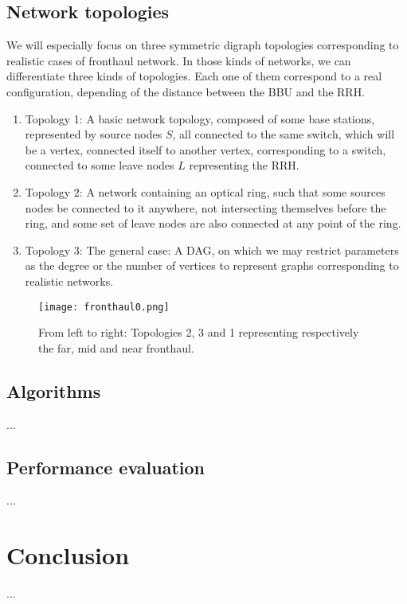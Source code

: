 \documentclass{article}
\begin{document}
\subsection{Network topologies}
We will especially focus on three symmetric digraph topologies corresponding to realistic cases  of  fronthaul network. In those kinds of networks, we can differentiate three kinds of
topologies. Each one of them correspond to a real configuration, depending of the distance between the BBU and the RRH.
\begin{enumerate}
 \item Topology 1: A basic network topology, composed of some base stations, represented by source nodes $S$, all connected to the same switch,
which will be a vertex, connected itself to another vertex, corresponding to a switch, connected to some leave nodes $L$ representing the RRH.
\item Topology 2: A network containing an optical ring, such that some sources nodes be connected to it anywhere, not intersecting themselves before the ring,
and some set of leave nodes are also connected at any point of the ring.
\item Topology 3: The general case: A DAG, on which we may restrict parameters as the degree or the number of vertices to represent graphs corresponding to realistic networks.
\end{enumerate}

 \begin{figure}[H]

\begin{center}
 
\texttt{[image: fronthaul0.png]}\\

\end{center}
\caption{From left to right: Topologies 2, 3 and 1 representing respectively the far, mid and near fronthaul.}
\end{figure}
 


\subsection{Algorithms}
...
\subsection{Performance evaluation}
...
\section{Conclusion}
...
\newpage
\end{document}
